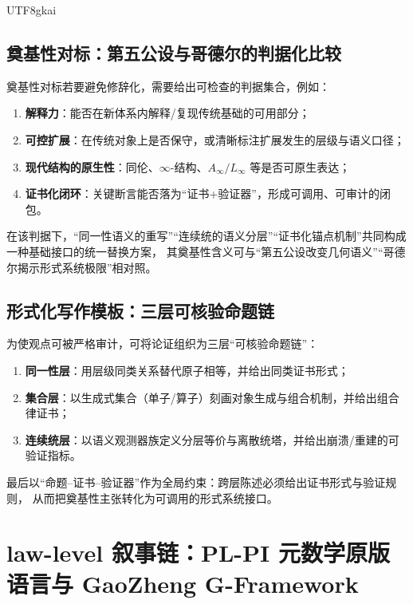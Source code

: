 \documentclass[12pt]{article}
\begin{document}
\begin{CJK*}{UTF8}{gkai}
\subsection{奠基性对标：第五公设与哥德尔的判据化比较}
\label{subsec:tex19-foundational-comparison}

奠基性对标若要避免修辞化，需要给出可检查的判据集合，例如：
\begin{enumerate}
  \item \textbf{解释力}：能否在新体系内解释/复现传统基础的可用部分；
  \item \textbf{可控扩展}：在传统对象上是否保守，或清晰标注扩展发生的层级与语义口径；
  \item \textbf{现代结构的原生性}：同伦、$\infty$-结构、$A_\infty/L_\infty$ 等是否可原生表达；
  \item \textbf{证书化闭环}：关键断言能否落为“证书+验证器”，形成可调用、可审计的闭包。
\end{enumerate}
在该判据下，“同一性语义的重写”“连续统的语义分层”“证书化锚点机制”共同构成一种基础接口的统一替换方案，
其奠基性含义可与“第五公设改变几何语义”“哥德尔揭示形式系统极限”相对照。

\subsection{形式化写作模板：三层可核验命题链}
\label{subsec:tex19-writing-template}

为使观点可被严格审计，可将论证组织为三层“可核验命题链”：
\begin{enumerate}
  \item \textbf{同一性层}：用层级同类关系替代原子相等，并给出同类证书形式；
  \item \textbf{集合层}：以生成式集合（单子/算子）刻画对象生成与组合机制，并给出组合律证书；
  \item \textbf{连续统层}：以语义观测器族定义分层等价与离散统塔，并给出崩溃/重建的可验证指标。
\end{enumerate}
最后以“命题--证书--验证器”作为全局约束：跨层陈述必须给出证书形式与验证规则，
从而把奠基性主张转化为可调用的形式系统接口。

\clearpage

\section{law-level 叙事链：PL-PI 元数学原版语言与 \texorpdfstring{GaoZheng G-Framework}{GaoZheng G-Framework}}


\end{CJK*}
\end{document}
